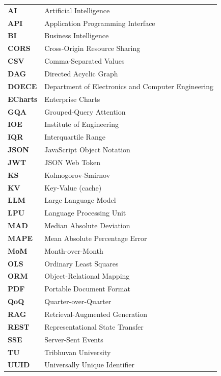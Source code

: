 \documentclass[12pt,a4paper,openany]{report}
\begin{document}
\renewcommand{\arraystretch}{1.2}
\begin{longtable}{p{3cm} p{9cm}}
\textbf{AI} & Artificial Intelligence \\
\textbf{API} & Application Programming Interface \\
\textbf{BI} & Business Intelligence \\
\textbf{CORS} & Cross-Origin Resource Sharing \\
\textbf{CSV} & Comma-Separated Values \\
\textbf{DAG} & Directed Acyclic Graph \\
\textbf{DOECE} & Department of Electronics and Computer Engineering \\
\textbf{ECharts} & Enterprise Charts \\
\textbf{GQA} & Grouped-Query Attention \\
\textbf{IOE} & Institute of Engineering \\
\textbf{IQR} & Interquartile Range \\
\textbf{JSON} & JavaScript Object Notation \\
\textbf{JWT} & JSON Web Token \\
\textbf{KS} & Kolmogorov-Smirnov \\
\textbf{KV} & Key-Value (cache) \\
\textbf{LLM} & Large Language Model \\
\textbf{LPU} & Language Processing Unit \\
\textbf{MAD} & Median Absolute Deviation \\
\textbf{MAPE} & Mean Absolute Percentage Error \\
\textbf{MoM} & Month-over-Month \\
\textbf{OLS} & Ordinary Least Squares \\
\textbf{ORM} & Object-Relational Mapping \\
\textbf{PDF} & Portable Document Format \\
\textbf{QoQ} & Quarter-over-Quarter \\
\textbf{RAG} & Retrieval-Augmented Generation \\
\textbf{REST} & Representational State Transfer \\
\textbf{SSE} & Server-Sent Events \\
\textbf{TU} & Tribhuvan University \\
\textbf{UUID} & Universally Unique Identifier \\
\end{longtable}
\end{document}
